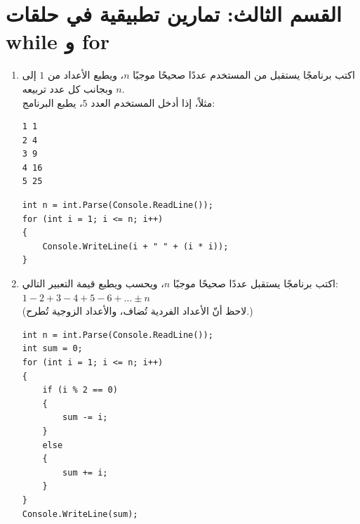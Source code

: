\documentclass[14pt]{extarticle}
\begin{document}
\clearpage
\section*{القسم الثالث: تمارين تطبيقية في حلقات \textenglish{while} و \textenglish{for}}

\begin{enumerate}[resume, itemsep=2em]

\item اكتب برنامجًا يستقبل من المستخدم عددًا صحيحًا موجبًا $n$، ويطبع الأعداد من $1$ إلى $n$ وبجانب كل عدد تربيعه. \\
مثلاً، إذا أدخل المستخدم العدد $5$، يطبع البرنامج:
\begin{boxCode}
\begin{english}
\begin{verbatim}
1 1
2 4
3 9
4 16
5 25
\end{verbatim}
\end{english}
\end{boxCode}
\ifwithsols
\begin{boxSolution}
\begin{english}
\begin{verbatim}
int n = int.Parse(Console.ReadLine());
for (int i = 1; i <= n; i++)
{
    Console.WriteLine(i + " " + (i * i));
}
\end{verbatim}
\end{english}
\end{boxSolution}
\fi
\filbreak

\item اكتب برنامجًا يستقبل عددًا صحيحًا موجبًا $n$، ويحسب ويطبع قيمة التعبير التالي: \\
$1 - 2 + 3 - 4 + 5 - 6 + \dots \pm n$ \\
(لاحظ أنّ الأعداد الفردية تُضاف، والأعداد الزوجية تُطرح.)
\ifwithsols
\begin{boxSolution}
\begin{english}
\begin{verbatim}
int n = int.Parse(Console.ReadLine());
int sum = 0;
for (int i = 1; i <= n; i++)
{
    if (i % 2 == 0)
    {
        sum -= i;
    }
    else
    {
        sum += i;
    }
}
Console.WriteLine(sum);
\end{verbatim}
\end{english}
\end{boxSolution}
\fi
\filbreak


\end{enumerate}
\end{document}
